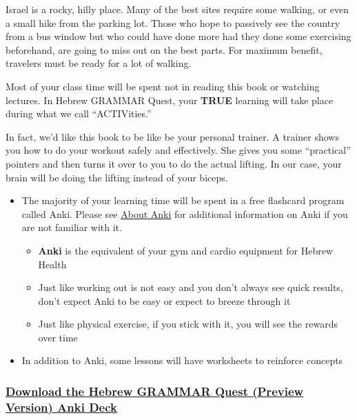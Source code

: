 \documentclass[
]{turabian-researchpaper}
\providecommand{\tightlist}{%
  \setlength{\itemsep}{0pt}\setlength{\parskip}{0pt}}
\begin{document}
Israel is a rocky, hilly place. Many of the best sites require some walking, or even a small hike from the parking lot. Those who hope to passively see the country from a bus window but who could have done more had they done some exercising beforehand, are going to miss out on the best parts. For maximum benefit, travelers must be ready for a lot of walking.

Most of your class time will be spent not in reading this book or watching lectures. In Hebrew GRAMMAR Quest, your \textbf{TRUE} learning will take place during what we call ``ACTIVities.''

In fact, we'd like this book to be like be your personal trainer. A trainer shows you how to do your workout safely and effectively. She gives you some ``practical'' pointers and then turns it over to you to do the actual lifting. In our case, your brain will be doing the lifting instead of your biceps.

\begin{itemize}
\tightlist
\item
  The majority of your learning time will be spent in a free flashcard program called Anki. Please see \protect\hyperlink{Anki}{About Anki} for additional information on Anki if you are not familiar with it.

  \begin{itemize}
  \tightlist
  \item
    \textbf{Anki} is the equivalent of your gym and cardio equipment for Hebrew Health
  \item
    Just like working out is not easy and you don't always see quick results, don't expect Anki to be easy or expect to breeze through it
  \item
    Just like physical exercise, if you stick with it, you will see the rewards over time
  \end{itemize}
\item
  In addition to Anki, some lessons will have worksheets to reinforce concepts
\end{itemize}

\hypertarget{download-the-hebrew-grammar-quest-preview-version-anki-deck}{%
\subsubsection*{\texorpdfstring{\href{./images/Hebrew\%20Grammar\%20Quest\%20PREVIEW.apkg}{Download the Hebrew GRAMMAR Quest (Preview Version) Anki Deck}}{Download the Hebrew GRAMMAR Quest (Preview Version) Anki Deck}}\label{download-the-hebrew-grammar-quest-preview-version-anki-deck}}
\end{document}
